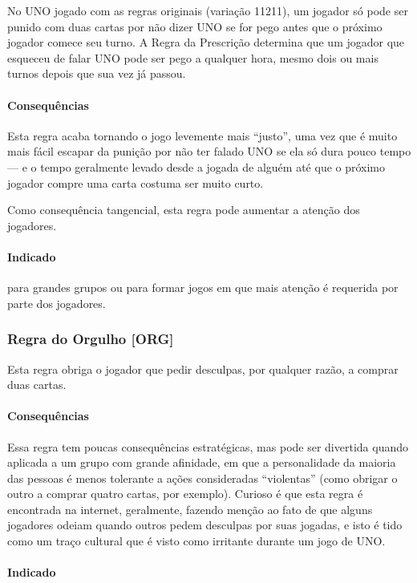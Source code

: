 No UNO jogado com as regras originais (variação 11211), um jogador só pode ser punido com duas cartas por não dizer UNO se for pego antes que o próximo jogador comece seu turno. A Regra da Prescrição determina que um jogador que esqueceu de falar UNO pode ser pego a qualquer hora, mesmo dois ou mais turnos depois que sua vez já passou.

\paragraph{Consequências}

Esta regra acaba tornando o jogo levemente mais ``justo'', uma vez que é muito mais fácil escapar da punição por não ter falado UNO se ela só dura pouco tempo --- e o tempo geralmente levado desde a jogada de alguém até que o próximo jogador compre uma carta costuma ser muito curto.

Como consequência tangencial, esta regra pode aumentar a atenção dos jogadores.

\paragraph{Indicado} 

para grandes grupos ou para formar jogos em que mais atenção é requerida por parte dos jogadores.

\subsubsection{Regra do Orgulho [ORG]}

Esta regra obriga o jogador que pedir desculpas, por qualquer razão, a comprar duas cartas.

\paragraph{Consequências}

Essa regra tem poucas consequências estratégicas, mas pode ser divertida quando aplicada a um grupo com grande afinidade, em que a personalidade da maioria das pessoas é menos tolerante a ações consideradas ``violentas'' (como obrigar o outro a comprar quatro cartas, por exemplo). Curioso é que esta regra é encontrada na internet, geralmente, fazendo menção ao fato de que alguns jogadores odeiam quando outros pedem desculpas por suas jogadas, e isto é tido como um traço cultural que é visto como irritante durante um jogo de UNO.

\paragraph{Indicado}

